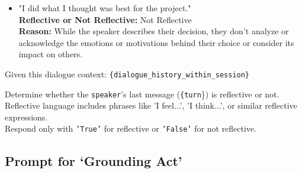 \begin{tcolorbox}[title=Reflectiveness Classification, myboxstyle, breakable]
\begin{itemize}
    \item "I did what I thought was best for the project."  \\
    \textbf{Reflective or Not Reflective:} Not Reflective  \\
    \textbf{Reason:} While the speaker describes their decision, they don’t analyze or acknowledge the emotions or motivations behind their choice or consider its impact on others.
\end{itemize}

Given this dialogue context:  
\texttt{{\{dialogue\_history\_within\_session\}}}

Determine whether the \texttt{{speaker}}'s last message (\texttt{\{turn}\}) is reflective or not.  \\
Reflective language includes phrases like 'I feel...', 'I think...', or similar reflective expressions.  \\
Respond only with \texttt{'True'} for reflective or \texttt{'False'} for not reflective.
\end{tcolorbox}

\subsection{Prompt for `Grounding Act'}
\label{appendix:evaluation-grounding}

